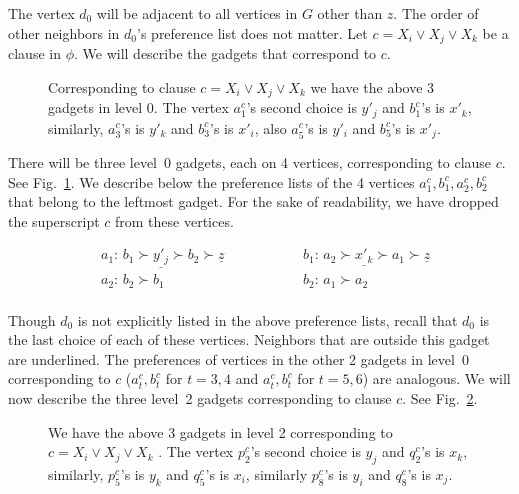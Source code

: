 \documentclass{llncs}
\begin{document}
The vertex $d_0$ will be adjacent to all vertices in $G$ other than $z$. The order of other neighbors in $d_0$'s preference list does not matter.
Let $c = X_i \vee X_j \vee X_k$ be a clause in $\phi$. We will describe the gadgets that correspond to $c$.

\begin{figure}[h]
\centerline{\resizebox{0.74\textwidth}{!}{}}
\caption{Corresponding to clause $c =  X_i \vee X_j \vee X_k$ we have the above 3 gadgets in level 0. The vertex $a^c_1$'s second choice
  is $y'_j$ and $b^c_1$'s is $x'_k$, similarly, $a^c_3$'s is $y'_k$ and $b^c_3$'s is $x'_i$, also $a^c_5$'s is $y'_i$ and $b^c_5$'s is $x'_j$.}
\label{level0:example}
\end{figure}

\medskip

There will be three level~0 gadgets, each on 4 vertices, corresponding to clause $c$. See Fig.~\ref{level0:example}.
We describe below the preference lists of the 4 vertices $a^c_1,b^c_1,a^c_2,b^c_2$ that belong to the leftmost gadget.
For the sake of readability, we have dropped the superscript $c$ from these vertices.

\begin{minipage}[c]{0.45\textwidth}
			
			\centering
			\begin{align*}
			        &a_1\colon \, b_1 \succ \underline{y'_j} \succ b_2 \succ \underline{z}  \qquad\qquad && b_1\colon \, a_2 \succ \underline{x'_k} \succ a_1 \succ \underline{z} \\
                                &a_2\colon \, b_2 \succ b_1  \qquad\qquad && b_2\colon \, a_1 \succ a_2 \\
			\end{align*}
\end{minipage}


Though $d_0$ is not explicitly listed in the above preference lists,
recall that $d_0$ is the last choice of each of these vertices. Neighbors that are outside this gadget are underlined.
The preferences of vertices in the other 2 gadgets in level~0 corresponding to $c$ ($a^c_t,b^c_t$ for $t = 3,4$ and $a^c_t,b^c_t$ for $t = 5,6$) are analogous.
We will now describe the three level~2 gadgets corresponding to clause $c$. See Fig.~\ref{level2:example}.

\begin{figure}[h]
\centerline{\resizebox{0.8\textwidth}{!}{}}
\caption{We have the above 3 gadgets in level 2 corresponding to $c =  X_i \vee X_j \vee X_k$ . The vertex $p^c_2$'s second choice is
   $y_j$ and $q^c_2$'s is $x_k$, similarly, $p^c_5$'s is $y_k$ and $q^c_5$'s is $x_i$, similarly $p^c_8$'s is $y_i$ and $q^c_8$'s is $x_j$.}
\label{level2:example}
\end{figure}
\end{document}

